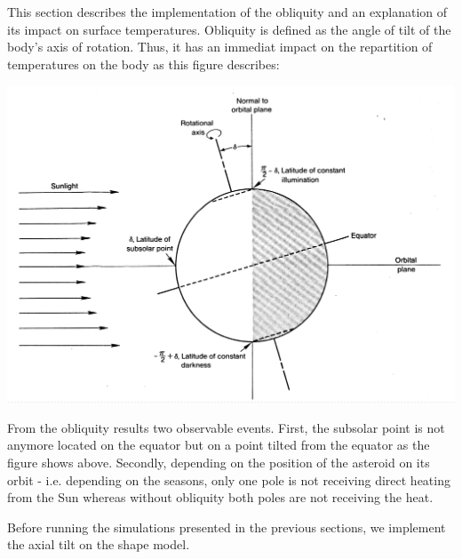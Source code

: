 This section describes the implementation of the obliquity and an explanation of its impact on surface temperatures. Obliquity is defined as the angle of tilt of the body's axis of rotation. Thus, it has an immediat impact on the repartition of temperatures on the body as this figure describes: 
\begin{center}
    \includegraphics[width=\linewidth]{rsc/obliquity.png}
    \label{fig:6.1}
\end{center}
From the obliquity results two observable events. First, the subsolar point is not anymore located on the equator but on a point tilted from the equator as the figure shows above. Secondly, depending on the position of the asteroid on its orbit - i.e. depending on the seasons, only one pole is not receiving direct heating from the Sun whereas without obliquity both poles are not receiving the heat.

Before running the simulations presented in the previous sections, we implement the axial tilt on the shape model.

